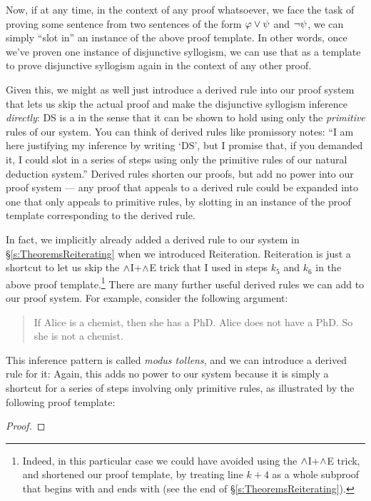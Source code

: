 \noindent Now, if at any time, in the context of any proof whatsoever, we face the task of proving some sentence \meta{\varphi} from two sentences of the form $\mathcal{\varphi} \vee \mathcal{\psi}$ and $\neg \mathcal{\psi}$, we can simply ``slot in'' an instance of the above proof template.  In other words, once we've proven one instance of disjunctive syllogism, we can use that as a template to prove disjunctive syllogism again in the context of any other proof.

Given this, we might as well just introduce a derived rule into our proof system that lets us skip the actual proof and make the disjunctive syllogism inference \emph{directly}:
DS is a  in the sense that it can be shown to hold using only the \emph{primitive} rules of our system.    You can think of derived rules like promissory notes: ``I am here justifying my inference by writing `DS', but I promise that, if you demanded it, I could slot in a series of steps using only the primitive rules of our natural deduction system.''  Derived rules shorten our proofs, but add no power into our proof system --- any proof that appeals to a derived rule could be expanded into one that only appeals to primitive rules, by slotting in an instance of the proof template corresponding to the derived rule.

In fact, we implicitly already added a derived rule to our system in \S\ref{s:TheoremsReiterating} when we introduced Reiteration.  Reiteration is just a shortcut to let us skip the $\wedge$I+$\wedge$E trick that I used in steps $k_5$ and $k_6$ in the above proof template.\footnote{Indeed, in this particular case we could have avoided using the $\wedge$I+$\wedge$E trick, and shortened our proof template, by treating line $k+4$ as a whole subproof that begins with \meta{\psi} and ends with \meta{\psi} (see the end of \S\ref{s:TheoremsReiterating}).}  There are many further useful derived rules we can add to our proof system.  For example, consider the following argument:
	\begin{quote}
		If Alice is a chemist, then she has a PhD. Alice does not have a PhD. So she is not a chemist.
	\end{quote}
This inference pattern is called \emph{modus tollens}, and we can introduce a derived rule for it:
Again, this adds no power to our system because it is simply a shortcut for a series of steps involving only primitive rules, as illustrated by the following proof template:
\begin{proof}
		\open
		\close
\end{proof}

